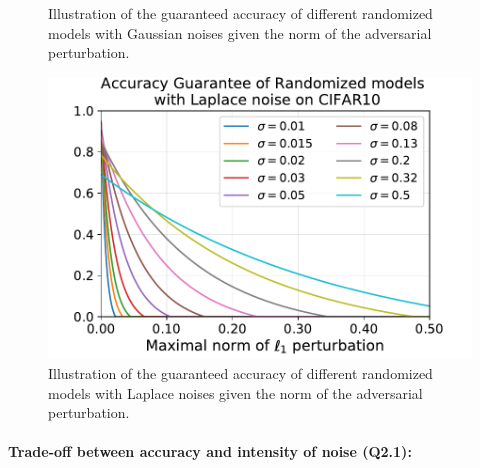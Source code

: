 {\begin{figure}[H]
\caption{Illustration of the guaranteed accuracy of different randomized models with Gaussian noises given the norm of the adversarial perturbation.}
  \label{figure:ap3-gauss_certif_CIFAR10}
  \vspace{0.8cm}
  \includegraphics[scale=0.55]{figures/appendix/ap3-randomized_inference/laplace_certif_CIFAR10.pdf}
  \caption{Illustration of the guaranteed accuracy of different randomized models with Laplace noises given the norm of the adversarial perturbation.}
  \label{figure:ap3-laplace_certif_CIFAR10}
  \label{figure:ap3-cifar10_results}
\end{figure}
}


\paragraph{Trade-off between accuracy and intensity of noise (Q2.1):}

